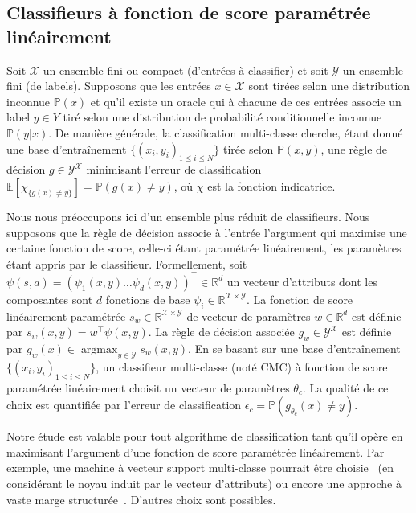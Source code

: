 \documentclass[english,utf8]{./hermes-journal}
\newcommand{\argmax}{\operatorname*{argmax}} %
\newcommand{\X}{\mathcal{X}}
\newcommand{\Y}{\mathcal{Y}}
\newcommand{\E}{\mathbb{E}}
\newcommand{\prob}{\mathbb{P}}
\begin{document}
\subsection{Classifieurs à fonction de score paramétrée linéairement} \label{subsec:background:classif}

Soit $\X$ un ensemble fini ou compact (d'entrées à classifier)
 et soit $\Y$ un ensemble fini (de labels). Supposons que les entrées $x\in
\X$ sont tirées selon une distribution inconnue $\prob(x)$ et qu'il existe un oracle qui à chacune de ces entrées associe un label $y\in Y$ tiré selon une distribution de probabilité conditionnelle inconnue $\prob(y|x)$. De manière générale, la classification multi-classe cherche, étant donné une base d'entraînement $\{(x_i,y_i)_{1\leq i \leq N}\}$ tirée selon $\prob(x,y)$, une règle de décision $g\in\Y^\X$ minimisant l'erreur de classification $\E[\chi_{\{g(x)\neq y\}}] = \prob(g(x)\neq y)$, où $\chi$ est la fonction indicatrice.

Nous nous préoccupons ici d'un ensemble plus réduit de classifieurs. Nous supposons que la règle de décision associe à l'entrée l'argument qui maximise une certaine fonction de score, celle-ci étant paramétrée linéairement, les paramètres étant appris par le classifieur. Formellement, soit $\psi(s,a) =
(\psi_1(x,y)  \dots  \psi_d(x,y))^\top\in \mathbb{R}^d$
un vecteur d'attributs dont les composantes sont $d$ fonctions de base $\psi_i\in\mathbb{R}^{\X\times\Y}$. La fonction de score linéairement paramétrée $s_w\in\mathbb{R}^{\X\times \Y}$ de vecteur de paramètres $w\in\mathbb{R}^d$ est définie par $s_w(x,y) = w^\top \psi(x,y)$. La règle de décision associée $g_w\in{\Y^\X}$ est définie par $g_w(x) \in \argmax_{y\in\Y}s_w(x,y)$. En se basant sur une base d'entraînement $\{(x_i,y_i)_{1\leq
i\leq N}\}$, un classifieur multi-classe (noté CMC) à fonction de score paramétrée linéairement choisit un vecteur de paramètres $\theta_c$. La qualité de ce choix est quantifiée par l'erreur de classification $\epsilon_c =
\prob(g_{\theta_c}(x)\neq y)$. %

Notre étude est valable pour tout algorithme de classification tant qu'il opère en maximisant l'argument d'une fonction de score paramétrée linéairement. Par exemple, une machine à vecteur support multi-classe pourrait être choisie~\cite{Guermeur:2007} (en considérant le noyau induit par le vecteur d'attributs) ou encore une approche à vaste marge structurée~\cite{Taskar:2005}. D'autres choix sont possibles.
\end{document}
